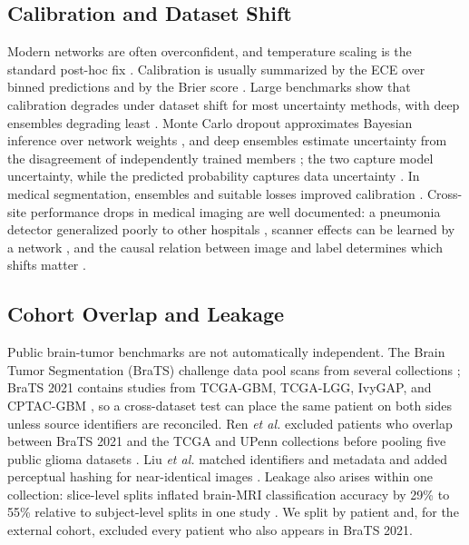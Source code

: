 \documentclass[journal]{IEEEtran}
\begin{document}
\subsection{Calibration and Dataset Shift}
Modern networks are often overconfident, and temperature scaling is the standard post-hoc fix \cite{guo2017}. Calibration is usually summarized by the ECE over binned predictions \cite{naeini2015} and by the Brier score \cite{brier1950}. Large benchmarks show that calibration degrades under dataset shift for most uncertainty methods, with deep ensembles degrading least \cite{ovadia2019}. Monte Carlo dropout approximates Bayesian inference over network weights \cite{gal2016}, and deep ensembles estimate uncertainty from the disagreement of independently trained members \cite{lakshminarayanan2017}; the two capture model uncertainty, while the predicted probability captures data uncertainty \cite{kendall2017}. In medical segmentation, ensembles and suitable losses improved calibration \cite{mehrtash2020}. Cross-site performance drops in medical imaging are well documented: a pneumonia detector generalized poorly to other hospitals \cite{zech2018}, scanner effects can be learned by a network \cite{glocker2019}, and the causal relation between image and label determines which shifts matter \cite{castro2020}.

\subsection{Cohort Overlap and Leakage}
Public brain-tumor benchmarks are not automatically independent. The Brain Tumor Segmentation (BraTS) challenge data pool scans from several collections \cite{menze2015,baid2021}; BraTS 2021 contains studies from TCGA-GBM, TCGA-LGG, IvyGAP, and CPTAC-GBM \cite{dorfner2025}, so a cross-dataset test can place the same patient on both sides unless source identifiers are reconciled. Ren \emph{et al.} excluded patients who overlap between BraTS 2021 and the TCGA and UPenn collections before pooling five public glioma datasets \cite{ren2025}. Liu \emph{et al.} matched identifiers and metadata and added perceptual hashing for near-identical images \cite{liu2026dare}. Leakage also arises within one collection: slice-level splits inflated brain-MRI classification accuracy by 29\% to 55\% relative to subject-level splits in one study \cite{yagis2021}. We split by patient and, for the external cohort, excluded every patient who also appears in BraTS 2021.
\end{document}
